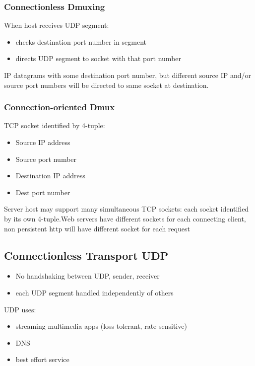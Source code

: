 \documentclass[11pt]{article}
\begin{document}
\subsubsection{Connectionless Dmuxing}
\label{sec:orge1a0a29}
When host receives UDP segment:
\begin{itemize}
\item checks destination port number in segment
\item directs UDP segment to socket with that port number
\end{itemize}

IP datagrams with some destination port number, but different source IP
and/or source port numbers will be directed to same socket at destination.

\subsubsection{Connection-oriented Dmux}
\label{sec:orge87c716}
TCP socket identified by 4-tuple:
\begin{itemize}
\item Source IP address
\item Source port number
\item Destination IP address
\item Dest port number
\end{itemize}

Server host may support many simultaneous TCP sockets: each socket
identified by its own 4-tuple.Web servers have different sockets for
each connecting client, non persistent http will have different socket
for each request

\subsection{Connectionless Transport UDP}
\label{sec:org2800bb8}
\begin{itemize}
\item No handshaking between UDP, sender, receiver
\item each UDP segment handled independently of others
\end{itemize}

UDP uses:
\begin{itemize}
\item streaming multimedia apps (loss tolerant, rate sensitive)
\item DNS
\item best effort service
\end{itemize}
\end{document}
